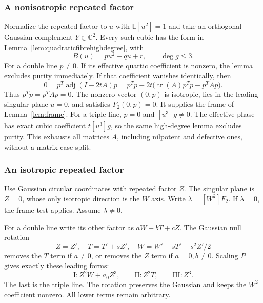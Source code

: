 \documentclass[11pt]{article}
\theoremstyle{definition}\newtheorem{definition}[theorem]{Definition}
\theoremstyle{remark}\newtheorem{remark}[theorem]{Remark}
\newcommand{\E}{\mathbb E}
\newcommand{\C}{\mathbb C}
\begin{document}
\subsubsection*{A nonisotropic repeated factor}

Normalize the repeated factor to $u$ with $\E[u^2]=1$ and take
an orthogonal Gaussian complement $Y\in\C^2$. Every such cubic
has the form in Lemma~\ref{lem:quadraticfibrehighdegree}, with
\[
 B(u)=p u^2+q u+r,\qquad\deg g\le3.
\]
For a double line $p\ne0$. If its effective quartic coefficient
is nonzero, the lemma excludes purity immediately. If that
coefficient vanishes identically, then
\[
 0=p^T\operatorname{adj}(I-2tA)p
   =p^Tp-2t\bigl(\operatorname{tr}(A)p^Tp-p^TAp\bigr).
\]
Thus $p^Tp=p^TAp=0$. The nonzero vector $(0,p)$ is isotropic,
lies in the leading singular plane $u=0$, and satisfies
$F_2(0,p)=0$. It supplies the frame of Lemma~\ref{lem:frame}.
For a triple line, $p=0$ and $[u^3]g\ne0$. The effective
phase has exact cubic coefficient $t[u^3]g$, so the same
high-degree lemma excludes purity. This exhausts all matrices
$A$, including nilpotent and defective ones, without a matrix
case split.

\subsubsection*{An isotropic repeated factor}

Use Gaussian circular coordinates with repeated factor $Z$.
The singular plane is $Z=0$, whose only isotropic direction is
the $W$ axis. Write $\lambda=[W^2]F_2$. If $\lambda=0$, the
frame test applies. Assume $\lambda\ne0$.

For a double line write its other factor as
$aW+bT+cZ$. The Gaussian null rotation
\[
 Z=Z',\quad T=T'+sZ',\quad W=W'-sT'-s^2Z'/2
\]
removes the $T$ term if $a\ne0$, or removes the $Z$ term if
$a=0,b\ne0$. Scaling $P$ gives exactly these leading forms:
\[
 \mathrm I: Z^2W+a_0Z^3,\qquad
 \mathrm {II}:Z^2T,\qquad \mathrm {III}:Z^3.
\]
The last is the triple line. The rotation preserves the Gaussian
and keeps the $W^2$ coefficient nonzero. All lower terms remain
arbitrary.
\end{document}
